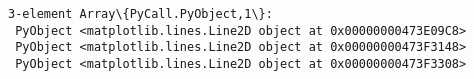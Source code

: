 \documentclass[11pt]{article}
\makeatletter
\newcommand{\boxspacing}{\kern\kvtcb@left@rule\kern\kvtcb@boxsep}
\newcommand{\prompt}[4]{
        \ttfamily\llap{{\color{#2}[#3]:\hspace{3pt}#4}}\vspace{-\baselineskip}
    }
\makeatother
\begin{document}
            \begin{tcolorbox}[breakable, size=fbox, boxrule=.5pt, pad at break*=1mm, opacityfill=0]
\prompt{Out}{outcolor}{16}{\boxspacing}
\begin{Verbatim}[commandchars=\\\{\}]
3-element Array\{PyCall.PyObject,1\}:
 PyObject <matplotlib.lines.Line2D object at 0x00000000473E09C8>
 PyObject <matplotlib.lines.Line2D object at 0x00000000473F3148>
 PyObject <matplotlib.lines.Line2D object at 0x00000000473F3308>
\end{Verbatim}
\end{tcolorbox}
        
    \begin{tcolorbox}[breakable, size=fbox, boxrule=1pt, pad at break*=1mm,colback=cellbackground, colframe=cellborder]
\prompt{In}{incolor}{ }{\boxspacing}
\begin{Verbatim}[commandchars=\\\{\}]

\end{Verbatim}
\end{tcolorbox}


    
    
    
\end{document}

